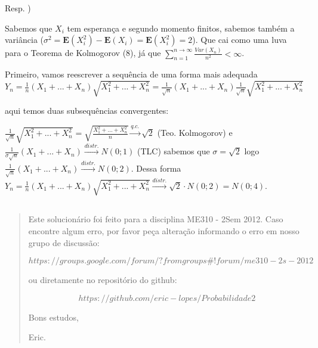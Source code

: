 \documentclass[english]{article}
\begin{document}
Resp. ) 

Sabemos que $X_{i}$ tem esperança e segundo momento finitos, sabemos
também a variância ($\sigma^{2}=\mathbf{E}(X_{i}^{2})-\mathbf{E}(X_{i})=\mathbf{E}(X_{i}^{2})=2$).
Que cai como uma luva para o Teorema de Kolmogorov (8), já que $\sum_{n=1}^{n\to\infty}\frac{Var(X_{n})}{n^{2}}<\infty$.

Primeiro, vamos reescrever a sequência de uma forma mais adequada
$Y_{n}=\frac{1}{n}(X_{1}+...+X_{n})\sqrt{X_{1}^{2}+...+X_{n}^{2}}=\frac{1}{\sqrt{n}}(X_{1}+...+X_{n})\frac{1}{\sqrt{n}}\sqrt{X_{1}^{2}+...+X_{n}^{2}}$

aqui temos duas subsequências convergentes:

$\frac{1}{\sqrt{n}}\sqrt{X_{1}^{2}+...+X_{n}^{2}}=\sqrt{\frac{X_{1}^{2}+...+X_{n}^{2}}{n}}\overset{q.c.}{\to}\sqrt{2}$
(Teo. Kolmogorov) e $\frac{1}{\sigma\sqrt{n}}(X_{1}+...+X_{n})\overset{distr.}{\to}N(0;1)$
(TLC) sabemos que $\sigma=\sqrt{2}$ logo $\frac{1}{\sqrt{n}}(X_{1}+...+X_{n})\overset{distr.}{\to}N(0;2)$.
Dessa forma $Y_{n}=\frac{1}{n}(X_{1}+...+X_{n})\sqrt{X_{1}^{2}+...+X_{n}^{2}}\overset{distr.}{\to}\sqrt{2}\cdot N(0;2)=N(0;4)$.


\subsection*{\textcompwordmark{}}


\subsubsection*{\pagebreak{}}
\begin{quotation}
Este solucionário foi feito para a disciplina ME310 - 2Sem 2012. Caso
encontre algum erro, por favor peça alteração informando o erro em
nosso grupo de discussão: 

$$https://groups.google.com/forum/?fromgroups\#!forum/me310-2s-2012$$

ou diretamente no repositório do github:

$$https://github.com/eric-lopes/Probabilidade2$$

Bons estudos,

Eric.\end{quotation}
\end{document}
